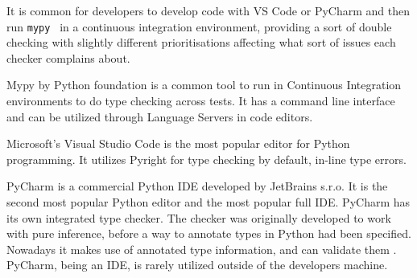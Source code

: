 It is common for developers to develop code with VS Code or PyCharm and then run {\tt mypy } in a continuous integration environment, providing a sort of double checking with slightly different prioritisations affecting what sort of issues each checker complains about.


Mypy by Python foundation is a common tool to run in Continuous Integration environments to do type checking across tests. It has a command line interface and can be utilized through Language Servers in code editors. 

Microsoft's Visual Studio Code is the most popular editor for Python programming\cite{python_software_foundation_jetbrains_sro_python_nodate}. It utilizes Pyright for type checking by default, in-line type errors.

PyCharm is a commercial Python IDE developed by JetBrains s.r.o. It is the second most popular Python editor and the most popular full IDE. PyCharm has its own integrated type checker. The checker was originally developed to work with pure inference, before a way to annotate types in Python had been specified. Nowadays it makes use of annotated type information, and can validate them \cite{jetbrains_type_hinting_pycharm}. PyCharm, being an IDE, is rarely utilized outside of the developers machine. 